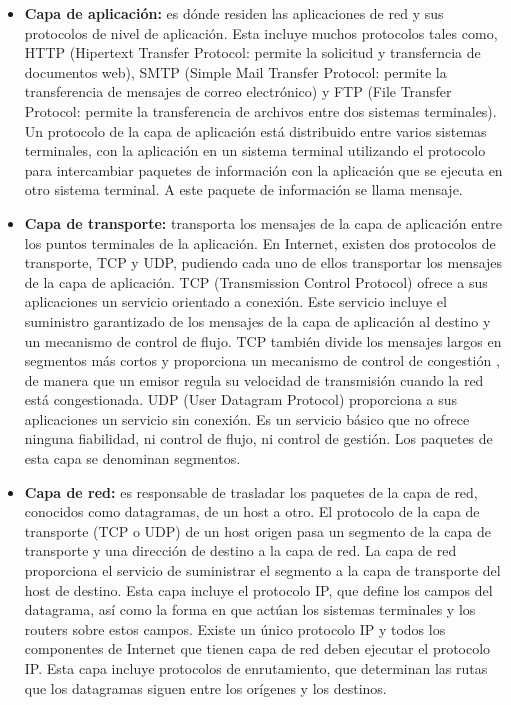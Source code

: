 \documentclass[a4paper,11pt]{article}
\begin{document}
\begin{itemize}
\item \textbf{Capa de aplicación:} es dónde residen las aplicaciones de red y sus protocolos de nivel de aplicación. Esta incluye muchos protocolos tales como, HTTP (Hipertext Transfer Protocol: permite la solicitud y transferncia de documentos web), SMTP (Simple Mail Transfer Protocol: permite la transferencia de mensajes de correo electrónico) y FTP (File Transfer Protocol: permite la transferencia de archivos entre dos sistemas terminales). Un protocolo de la capa de aplicación está distribuido entre varios sistemas terminales, con la aplicación en un sistema terminal utilizando el protocolo para intercambiar paquetes de información con la aplicación que se ejecuta en otro sistema terminal. A este paquete de información se llama mensaje.

\item \textbf{Capa de transporte:} transporta los mensajes de la capa de aplicación entre los puntos terminales de la aplicación. En Internet, existen dos protocolos de transporte, TCP y UDP, pudiendo cada uno de ellos transportar los mensajes de la capa de aplicación. TCP (Transmission Control Protocol) ofrece a sus aplicaciones un servicio orientado a conexión. Este servicio incluye el suministro garantizado de los mensajes de la capa de aplicación al destino y un mecanismo de control de flujo. TCP también divide los mensajes largos en segmentos más cortos y proporciona un mecanismo de control de congestión , de manera que un emisor regula su velocidad de transmisión cuando la red está congestionada. UDP (User Datagram Protocol) proporciona a sus aplicaciones un servicio sin conexión. Es un servicio básico que no ofrece ninguna fiabilidad, ni control de flujo, ni control de gestión. Los paquetes de esta capa se denominan segmentos.

\item \textbf{Capa de red:} es responsable de trasladar los paquetes de la capa de red, conocidos como datagramas, de un host a otro. El protocolo de la capa de transporte (TCP o UDP) de un host origen pasa un segmento de la capa de transporte y una dirección de destino a la capa de red. La capa de red proporciona el servicio de suministrar el segmento a la capa de transporte del host de destino. Esta capa incluye el protocolo IP, que define los campos del datagrama, así como la forma en que actúan los sistemas terminales y los routers sobre estos campos. Existe un único protocolo IP y todos los componentes de Internet que tienen capa de red deben ejecutar el protocolo IP. Esta capa incluye protocolos de enrutamiento, que determinan las rutas que los datagramas siguen entre los orígenes y los destinos. 


\end{itemize}
\end{document}

